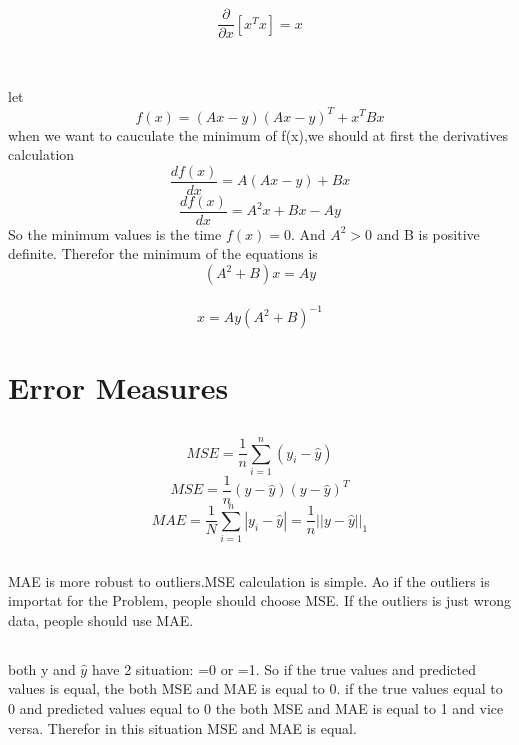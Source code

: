 \documentclass{article}
\begin{document}
\subsection{ }
\[\frac{\partial}{\partial x}[x^Tx]=x\]\
\subsection{ }
let 
\[f(x)=(Ax-y)(Ax-y)^T+x^TBx\]
when we want to cauculate the minimum of f(x),we should at first the derivatives calculation
\[\frac{df(x)}{dx}=A(Ax-y)+Bx\]
\[\frac{df(x)}{dx}=A^2x+Bx-Ay\]
So the minimum values is the time $ f(x)=0 $. And $ A^2 >0$ and B is positive definite. Therefor the minimum of the equations is
\\\[(A^2+B)x=Ay\]
\\\[x=Ay(A^2+B)^{-1}\]                                    
\section{Error Measures}
\subsection{ }
\[MSE=\frac{1}{n}\sum_{i=1}^{n}(y_i-\widehat{y})\]
\[MSE=\frac{1}{n}(y-\widehat{y})(y-\widehat{y})^T\]
\[MAE=\frac{1}{N}\sum_{i=1}^{n}|y_i-\widehat{y}|=\frac{1}{n}||y-\widehat{y}||_1\]
\subsection{ }
MAE is more robust to outliers.MSE calculation is simple. Ao if the outliers is importat for the Problem, people should choose MSE. If the outliers is just wrong data, people should use MAE.
\subsection{ }
both y and $ \widehat{y} $ have 2 situation: =0 or =1. So if the true values and predicted values is equal, the both MSE and MAE is equal to 0. if the true values equal to 0 and predicted values equal to 0 the both MSE and MAE is equal to 1 and vice versa. Therefor in this situation MSE and MAE is equal.
\end{document}
